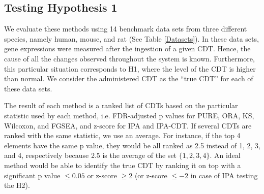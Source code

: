 \subsection*{Testing Hypothesis 1}
We evaluate these methods using 14 benchmark data sets from three different species, namely human, mouse, and rat (See Table \ref{Datasets}). 
In these data sets, gene expressions were measured after the ingestion of a given CDT.
Hence, the cause of all the changes observed  throughout the system is known. Furthermore, this particular situation corresponds to  H1, where the level of the CDT is higher than normal.
We consider the administered CDT as the ``true CDT'' for each of these data sets.

The result of each method is a ranked list of CDTs based on the particular statistic used by each method, i.e. FDR-adjusted p values for PURE, ORA, KS, Wilcoxon, and FGSEA, and  z-score  for IPA and IPA-CDT. 
If several CDTs are ranked with the same statistic, we use an average. For instance, if  the top 4 elements have the same p value, they would be all ranked as 2.5 instead of 1, 2, 3, and 4, respectively because 2.5 is the average of the set $\{1, 2, 3, 4\}$.
An ideal method would be able to identify the true CDT by ranking it on top with a significant p value $\leq 0.05$ or  z-score $\geq 2$ (or z-score $\leq -2$ in case of IPA testing the H2).



